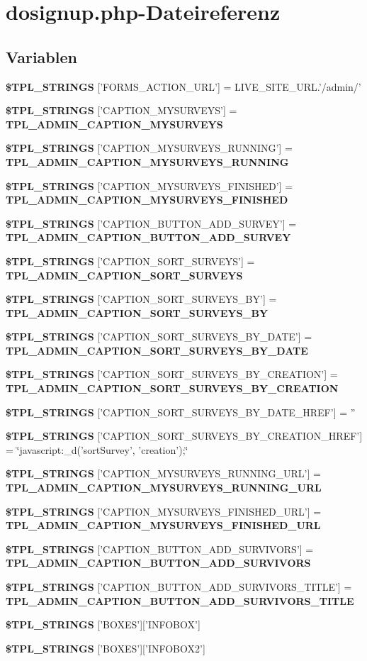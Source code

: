 \section{dosignup.php-Dateireferenz}
\label{dosignup_8php}
\subsection*{Variablen}
\begin{CompactItemize}
\item 
{\bf \$TPL\_\-STRINGS} ['FORMS\_\-ACTION\_\-URL'] = LIVE\_\-SITE\_\-URL.'/admin/'
\item 
{\bf \$TPL\_\-STRINGS} ['CAPTION\_\-MYSURVEYS'] = {\bf TPL\_\-ADMIN\_\-CAPTION\_\-MYSURVEYS}
\item 
{\bf \$TPL\_\-STRINGS} ['CAPTION\_\-MYSURVEYS\_\-RUNNING'] = {\bf TPL\_\-ADMIN\_\-CAPTION\_\-MYSURVEYS\_\-RUNNING}
\item 
{\bf \$TPL\_\-STRINGS} ['CAPTION\_\-MYSURVEYS\_\-FINISHED'] = {\bf TPL\_\-ADMIN\_\-CAPTION\_\-MYSURVEYS\_\-FINISHED}
\item 
{\bf \$TPL\_\-STRINGS} ['CAPTION\_\-BUTTON\_\-ADD\_\-SURVEY'] = {\bf TPL\_\-ADMIN\_\-CAPTION\_\-BUTTON\_\-ADD\_\-SURVEY}
\item 
{\bf \$TPL\_\-STRINGS} ['CAPTION\_\-SORT\_\-SURVEYS'] = {\bf TPL\_\-ADMIN\_\-CAPTION\_\-SORT\_\-SURVEYS}
\item 
{\bf \$TPL\_\-STRINGS} ['CAPTION\_\-SORT\_\-SURVEYS\_\-BY'] = {\bf TPL\_\-ADMIN\_\-CAPTION\_\-SORT\_\-SURVEYS\_\-BY}
\item 
{\bf \$TPL\_\-STRINGS} ['CAPTION\_\-SORT\_\-SURVEYS\_\-BY\_\-DATE'] = {\bf TPL\_\-ADMIN\_\-CAPTION\_\-SORT\_\-SURVEYS\_\-BY\_\-DATE}
\item 
{\bf \$TPL\_\-STRINGS} ['CAPTION\_\-SORT\_\-SURVEYS\_\-BY\_\-CREATION'] = {\bf TPL\_\-ADMIN\_\-CAPTION\_\-SORT\_\-SURVEYS\_\-BY\_\-CREATION}
\item 
{\bf \$TPL\_\-STRINGS} ['CAPTION\_\-SORT\_\-SURVEYS\_\-BY\_\-DATE\_\-HREF'] = ''
\item 
{\bf \$TPL\_\-STRINGS} ['CAPTION\_\-SORT\_\-SURVEYS\_\-BY\_\-CREATION\_\-HREF'] = \char`\"{}javascript:\_\-d('sortSurvey', 'creation');\char`\"{}
\item 
{\bf \$TPL\_\-STRINGS} ['CAPTION\_\-MYSURVEYS\_\-RUNNING\_\-URL'] = {\bf TPL\_\-ADMIN\_\-CAPTION\_\-MYSURVEYS\_\-RUNNING\_\-URL}
\item 
{\bf \$TPL\_\-STRINGS} ['CAPTION\_\-MYSURVEYS\_\-FINISHED\_\-URL'] = {\bf TPL\_\-ADMIN\_\-CAPTION\_\-MYSURVEYS\_\-FINISHED\_\-URL}
\item 
{\bf \$TPL\_\-STRINGS} ['CAPTION\_\-BUTTON\_\-ADD\_\-SURVIVORS'] = {\bf TPL\_\-ADMIN\_\-CAPTION\_\-BUTTON\_\-ADD\_\-SURVIVORS}
\item 
{\bf \$TPL\_\-STRINGS} ['CAPTION\_\-BUTTON\_\-ADD\_\-SURVIVORS\_\-TITLE'] = {\bf TPL\_\-ADMIN\_\-CAPTION\_\-BUTTON\_\-ADD\_\-SURVIVORS\_\-TITLE}
\item 
{\bf \$TPL\_\-STRINGS} ['BOXES']['INFOBOX']
\item 
{\bf \$TPL\_\-STRINGS} ['BOXES']['INFOBOX2']
\end{CompactItemize}


